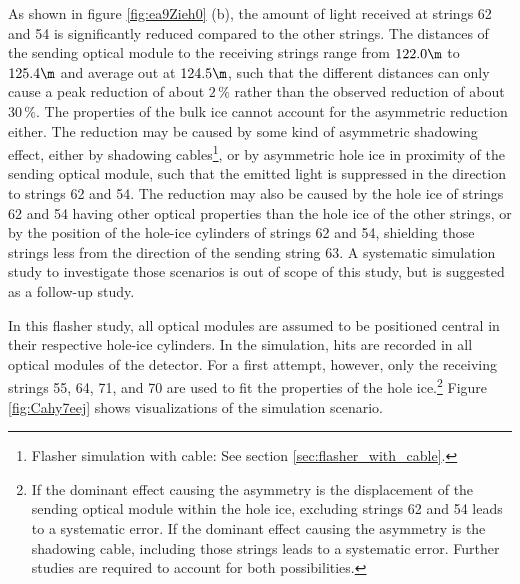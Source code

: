 As shown in figure \ref{fig:ea9Zieh0} (b), the amount of light received at strings 62 and 54 is significantly reduced compared to the other strings. The distances of the sending optical module to the receiving strings range from $122.0\m$ to $125.4\m$ and average out at $124.5\m$, such that the different distances can only cause a peak reduction of about $2\,\%$ rather than the observed reduction of about $30\,\%$.
The properties of the bulk ice cannot account for the asymmetric reduction either.
The reduction may be caused by some kind of asymmetric shadowing effect, either by shadowing cables\footnote{Flasher simulation with cable: See section \ref{sec:flasher_with_cable}.}, or by asymmetric hole ice in proximity of the sending optical module, such that the emitted light is suppressed in the direction to strings 62 and 54. The reduction may also be caused by the hole ice of strings 62 and 54 having other optical properties than the hole ice of the other strings, or by the position of the hole-ice cylinders of strings 62 and 54, shielding those strings less from the direction of the sending string 63. A systematic simulation study to investigate those scenarios is out of scope of this study, but is suggested as a follow-up study.\followup

In this flasher study, all optical modules are assumed to be positioned central in their respective hole-ice cylinders. In the simulation, hits are recorded in all optical modules of the detector. For a first attempt, however, only the receiving strings 55, 64, 71, and 70 are used to fit the properties of the hole ice.\footnote{If the dominant effect causing the asymmetry is the displacement of the sending optical module within the hole ice, excluding strings 62 and 54 leads to a systematic error. If the dominant effect causing the asymmetry is the shadowing cable, including those strings leads to a systematic error. Further studies are required to account for both possibilities.}
Figure \ref{fig:Cahy7eej} shows \steamshovel visualizations of the simulation scenario.

